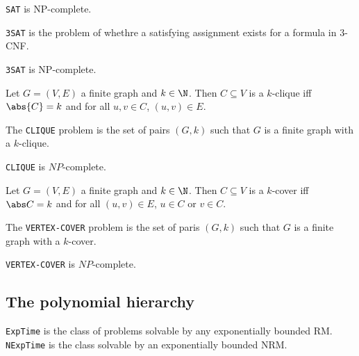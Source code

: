 \documentclass{article}
\begin{document}
\begin{theorem*}
	\texttt{SAT} is NP-complete.
\end{theorem*}

\begin{definition*}[3SAT]
	\texttt{3SAT} is the problem of whethre a satisfying assignment exists for a
	formula in 3-CNF.
\end{definition*}

\begin{theorem*}[II.20]
	\texttt{3SAT} is NP-complete.
\end{theorem*}

\begin{definition*}[CLIQUE]
	Let $G=(V,E)$ a finite graph and $k\in\N$. Then $C\subseteq V$ is a
	$k$-clique iff $\abs{C} = k$ and for all $u,v\in C$, $(u,v)\in E$.

	The \texttt{CLIQUE} problem is the set of pairs $(G,k)$ such that
	$G$ is a finite graph with a $k$-clique.
\end{definition*}

\begin{theorem*}[II.22]
	\texttt{CLIQUE} is $NP$-complete.
\end{theorem*}

\begin{definition*}
	Let $G=(V,E)$ a finite graph and $k\in\N$. Then $C\subseteq V$ is a
	$k$-cover iff $\abs C = k$ and for all $(u,v)\in E$, $u\in C$ or $v\in C$.

	The \texttt{VERTEX-COVER} problem is the set of paris $(G,k)$ such that
	$G$ is a finite graph with a $k$-cover.
\end{definition*}

\begin{theorem*}
	\texttt{VERTEX-COVER} is $NP$-complete.
\end{theorem*}

\subsection{The polynomial hierarchy}

\begin{definition*}[ExpTime]
	\texttt{ExpTime} is the class of problems solvable by any exponentially
	bounded RM. \texttt{NExpTime} is the class solvable by an exponentially
	bounded NRM.
\end{definition*}
\end{document}
